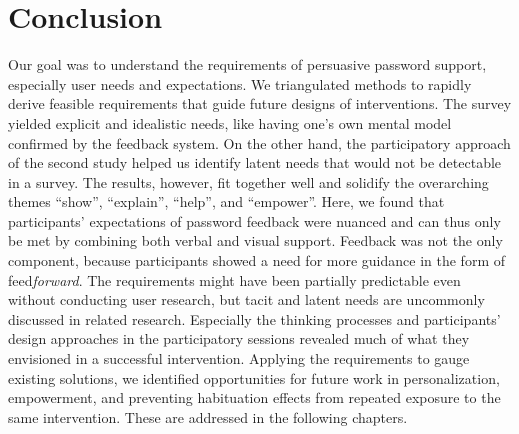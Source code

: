 \section{Conclusion}
Our goal was to understand the requirements of persuasive password support, especially user needs and expectations. 
We triangulated methods to rapidly derive feasible requirements that guide future designs of interventions. 
The survey yielded explicit and idealistic needs, like having one's own mental model confirmed by the feedback system. On the other hand, the participatory approach of the second study helped us identify latent needs that would not be detectable in a survey. The results, however, fit together well and solidify the overarching themes ``show'', ``explain'', ``help'', and ``empower''. 
Here, we found that participants' expectations of password feedback were nuanced and can thus only be met by combining both verbal and visual support. Feedback was not the only component, because participants showed a need for more guidance in the form of feed\textit{forward}.
The requirements might have been partially predictable even without conducting user research, but tacit and latent needs are uncommonly discussed in related research. Especially the thinking processes and participants' design approaches in the participatory sessions revealed much of what they envisioned in a successful intervention.
Applying the requirements to gauge existing solutions, we identified opportunities for future work in personalization, empowerment, and preventing habituation effects from repeated exposure to the same intervention. These are addressed in the following chapters. 


